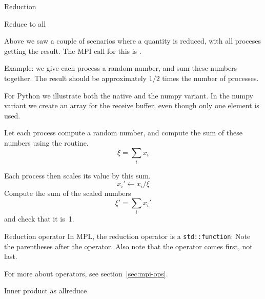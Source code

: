
 {Reduction}

 {Reduce to all}
\label{sec:allreduce}

Above we saw a couple of scenarios where a quantity is reduced, with
all proceses getting the result. The MPI call for this is
%
.

Example: we give each process a random number, and sum these numbers together.
The result should be approximately $1/2$ times the number of processes.


For Python we illustrate both the native and the numpy variant. In the
numpy variant we create an array for the receive buffer, even though
only one element is used.


\begin{exercise}
  \label{ex:randommaxscale}
  Let each process compute a random number,
  and compute the sum of these numbers using the 
  routine.
  \[ \xi = \sum_i x_i \]

  Each process then scales its value
  by this sum.
  \[ x_i' \leftarrow x_i/ \xi \]
  Compute the sum of the scaled numbers
  \[ \xi' = \sum_i x_i' \]
  and check that it is~1.
\end{exercise}

\begin{mplnote}{Reduction operator}
  In \ac{MPL}, the reduction operator is a \lstinline+std::function+:
  Note the parentheses after the operator.
  Also note that the operator comes first, not last.
\end{mplnote}

For more about operators, see section~\ref{sec:mpi-ops}.

 {Inner product as allreduce}
\label{sec:dist-reduc}

